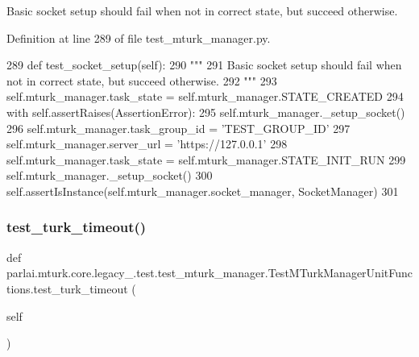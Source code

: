 \begin{DoxyVerb}Basic socket setup should fail when not in correct state, but succeed otherwise.
\end{DoxyVerb}
 

Definition at line 289 of file test\+\_\+mturk\+\_\+manager.\+py.


\begin{DoxyCode}
289     \textcolor{keyword}{def }test\_socket\_setup(self):
290         \textcolor{stringliteral}{"""}
291 \textcolor{stringliteral}{        Basic socket setup should fail when not in correct state, but succeed otherwise.}
292 \textcolor{stringliteral}{        """}
293         self.mturk\_manager.task\_state = self.mturk\_manager.STATE\_CREATED
294         with self.assertRaises(AssertionError):
295             self.mturk\_manager.\_setup\_socket()
296         self.mturk\_manager.task\_group\_id = \textcolor{stringliteral}{'TEST\_GROUP\_ID'}
297         self.mturk\_manager.server\_url = \textcolor{stringliteral}{'https://127.0.0.1'}
298         self.mturk\_manager.task\_state = self.mturk\_manager.STATE\_INIT\_RUN
299         self.mturk\_manager.\_setup\_socket()
300         self.assertIsInstance(self.mturk\_manager.socket\_manager, SocketManager)
301 
\end{DoxyCode}
\mbox{\label{classparlai_1_1mturk_1_1core_1_1legacy__2018_1_1test_1_1test__mturk__manager_1_1TestMTurkManagerUnitFunctions_a60dd7f7430c35cc31c82cc8773939d03}} 
\subsubsection{\texorpdfstring{test\+\_\+turk\+\_\+timeout()}{test\_turk\_timeout()}}
{\footnotesize\ttfamily def parlai.\+mturk.\+core.\+legacy\+\_.\+test.\+test\+\_\+mturk\+\_\+manager.\+Test\+M\+Turk\+Manager\+Unit\+Functions.\+test\+\_\+turk\+\_\+timeout (\begin{DoxyParamCaption}\item[{}]{self }\end{DoxyParamCaption})}

